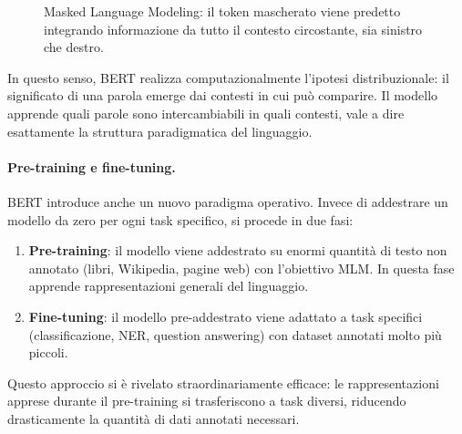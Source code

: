 \begin{figure}[htbp]
\centering
{}
\caption{Masked Language Modeling: il token mascherato viene predetto integrando informazione da tutto il contesto circostante, sia sinistro che destro.}
\label{fig:mlm}
\end{figure}
In questo senso, BERT realizza computazionalmente l'ipotesi distribuzionale: il significato di una parola emerge dai contesti in cui può comparire. Il modello apprende quali parole sono intercambiabili in quali contesti, vale a dire esattamente la struttura paradigmatica del linguaggio.
\paragraph{Pre-training e fine-tuning.}
BERT introduce anche un nuovo paradigma operativo. Invece di addestrare un modello da zero per ogni task specifico, si procede in due fasi:
\begin{enumerate}
    \item \textbf{Pre-training}: il modello viene addestrato su enormi quantità di testo non annotato (libri, Wikipedia, pagine web) con l'obiettivo MLM. In questa fase apprende rappresentazioni generali del linguaggio.
    \item \textbf{Fine-tuning}: il modello pre-addestrato viene adattato a task specifici (classificazione, NER, question answering) con dataset annotati molto più piccoli.
\end{enumerate}
Questo approccio si è rivelato straordinariamente efficace: le rappresentazioni apprese durante il pre-training si trasferiscono a task diversi, riducendo drasticamente la quantità di dati annotati necessari.

